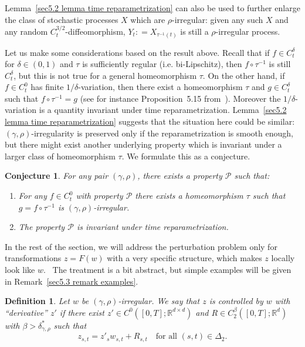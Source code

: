 \documentclass[10pt]{article}
\newenvironment{enumeratenumeric}{\begin{enumerate}[1.] }{\end{enumerate}}
\newtheorem{conjecture}[theorem]{Conjecture}
\newtheorem{definition}[theorem]{Definition}
\begin{document}
\begin{remark}
  Lemma~\ref{sec5.2 lemma time reparametrization} can also be used to further
  enlarge the class of stochastic processes $X$ which are
  $\rho$\mbox{-}irregular: given any such $X$ and any random $C^{3 /
  2}_t$\mbox{-}diffeomorphism, $Y_t : = X_{\tau^{- 1} (t)}$ is still a
  $\rho$\mbox{-}irregular process.
\end{remark}

Let us make some considerations based on the result above. Recall that if $f
\in C^{\delta}_t$ for $\delta \in (0, 1)$ and $\tau$ is sufficiently regular
(i.e. bi\mbox{-}Lipschitz), then $f \circ \tau^{- 1}$ is still $C^{\delta}_t$,
but this is not true for a general homeomorphism $\tau$. On the other hand, if
$f \in C^0_t$ has finite $1 / \delta$\mbox{-}variation, then there exist a
homeomorphism $\tau$ and $g \in C^{\delta}_t$ such that $f \circ \tau^{- 1} =
g$ (see for instance Proposition~5.15 from~{\cite{frizvictoir}}). Moreover the
$1 / \delta$\mbox{-}variation is a quantity invariant under time
reparametrization. Lemma~\ref{sec5.2 lemma time reparametrization} suggests
that the situation here could be similar: $(\gamma, \rho)$\mbox{-}irregularity
is preserved only if the reparametrization is smooth enough, but there might
exist another underlying property which is invariant under a larger class of
homeomorphism $\tau$. We formulate this as a conjecture.

\begin{conjecture}
  For any pair $(\gamma, \rho)$, there exists a property $\mathcal{P}$ such
  that:
  \begin{enumeratenumeric}
    \item For any $f \in C^0_t$ with property $\mathcal{P}$ there exists a
    homeomorphism $\tau$ such that $g = f \circ \tau^{- 1}$ is $(\gamma,
    \rho)$\mbox{-}irregular.
    
    \item The property $\mathcal{P}$ is invariant under time
    reparametrization.
  \end{enumeratenumeric}
\end{conjecture}

In the rest of the section, we will address the perturbation problem only for
transformations $z = F (w)$ with a very specific structure, which makes $z$
locally look like $w$. \ The treatment is a bit abstract, but simple examples
will be given in Remark~\ref{sec5.3 remark examples}.

\begin{definition}
  \label{sec5.3 defn controlled}Let $w$ be $(\gamma, \rho)$-irregular. We say
  that $z$ is controlled by $w$ with ``derivative'' $z'$ if there exist $z'
  \in C^0 ([0, T] ; \mathbb{R}^{d \times d})$ and $R \in C^{\beta}_2 ([0, T] ;
  \mathbb{R}^d)$ with $\beta > \delta^{\ast}_{\gamma, \rho}$ such that
  \[ z_{s, t} = z'_s w_{s, t} + R_{s, t} \quad \text{for all } (s, t) \in
     \Delta_2 . \]
\end{definition}
\end{document}
